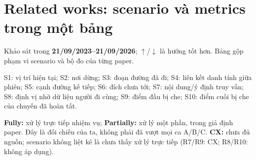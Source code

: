 \section{Related works: scenario và metrics trong một bảng}
Khảo sát trong \textbf{21/09/2023–21/09/2026}; $\uparrow$/$\downarrow$ là hướng tốt hơn. Bảng gộp phạm vi scenario và bộ đo của từng paper.

S1: vị trí hiện tại; S2: nơi dừng; S3: đoạn đường đã đi; S4: liên kết danh tính giữa phiên; S5: cạnh đường kế tiếp; S6: đích chưa tới; S7: nội dung/ý định truy vấn; S8: định vị nhờ dữ liệu người đi cùng; S9: điểm đầu bị che; S10: điểm cuối bị che của chuyến đã hoàn tất.

\textbf{Fully:} xử lý trực tiếp nhiệm vụ; \textbf{Partially:} xử lý một phần, trong giả định paper. Đây là đối chiếu của ta, không phải đã vượt mọi ca A/B/C. \textbf{CX:} chưa đủ nguồn; scenario không liệt kê là chưa thấy xử lý trực tiếp (R7/R9: CX; R8/R10: không áp dụng).

